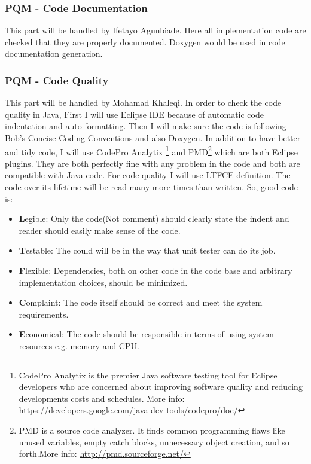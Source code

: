 \documentclass{article}
\begin{document}
\subsubsection{PQM - Code Documentation}
This part will be handled by Ifetayo Agunbiade. Here all implementation code are checked that they are properly documented. Doxygen would be used in code documentation generation.
\subsubsection{PQM - Code Quality}
This part will be handled by Mohamad Khaleqi. In order to check the code quality in Java, First I will use Eclipse IDE because of automatic code indentation and auto formatting. Then I will make sure the code is following Bob's Concise Coding Conventions and also Doxygen. In addition to have better and tidy code, I will use CodePro Analytix \footnote{CodePro Analytix is the premier Java software testing tool for Eclipse developers who are concerned about improving software quality and reducing developments costs and schedules. More info: \url{https://developers.google.com/java-dev-tools/codepro/doc/}} and PMD\footnote{ PMD is a source code analyzer. It finds common programming flaws like unused variables, empty catch blocks, unnecessary object creation, and so forth.More info: \url{http://pmd.sourceforge.net/}} which are both Eclipse plugins. They are both perfectly fine with any problem in the code and both are compatible with Java code. For code quality I will use LTFCE definition. The code over its lifetime will be read many more times than written. So, good code is: 
\begin{itemize}
 \item \textbf{L}egible: Only the code(Not comment) should clearly state the indent and reader should easily make sense of the code.
 \item \textbf{T}estable: The could will be in the way that unit tester can do its job.
 \item \textbf{F}lexible: Dependencies, both on other code in the code base and arbitrary implementation choices, should be minimized.
 \item \textbf{C}omplaint: The code itself should be correct and meet the system requirements.
 \item \textbf{E}conomical: The code should be responsible in terms of using system resources e.g. memory and CPU.
 
\end{itemize}
\end{document}
